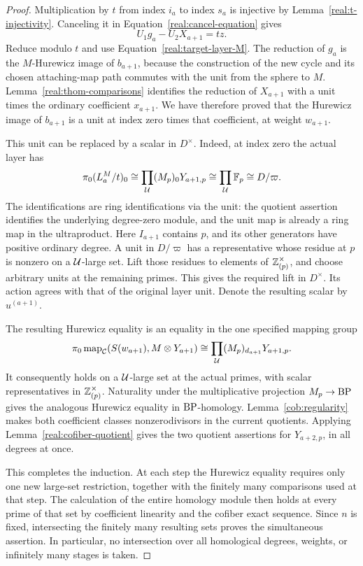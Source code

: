 \begin{proof}
Multiplication by \(t\) from index \(i_a\) to index \(s_a\)
is injective by Lemma~\ref{real:t-injectivity}.  Canceling it in
Equation~\eqref{real:cancel-equation} gives
\[
 U_1g_a-U_2X_{a+1}=tz.
\]
Reduce modulo \(t\) and use
Equation~\eqref{real:target-layer-M}.  The reduction of \(g_a\)
is the \(M\)-Hurewicz image of \(b_{a+1}\), because the
construction of the new cycle and its chosen attaching-map path
commutes with the unit from the sphere to \(M\).
Lemma~\ref{real:thom-comparisons} identifies the reduction of
\(X_{a+1}\) with a unit times the ordinary coefficient
\(x_{a+1}\).  We have therefore proved that the Hurewicz image
of \(b_{a+1}\) is a unit at index zero times that coefficient,
at weight \(w_{a+1}\).

This unit can be replaced by a scalar in \(D^\times\).
Indeed, at index zero the actual layer has
\begin{equation}
 \pi_0(L_a^M/t)_0
 \cong\prod_{\mathcal U}(M_p)_0Y_{a+1,p}
 \cong\prod_{\mathcal U}\mathbb F_p
 \cong D/\varpi.
 \label{real:scalar-layer}
\end{equation}
The identifications are ring identifications via the unit: the
quotient assertion identifies the underlying degree-zero module,
and the unit map is already a ring map in the ultraproduct.
Here \(I_{a+1}\) contains \(p\), and its other generators have
positive ordinary degree.  A unit in \(D/\varpi\) has a
representative whose residue at \(p\) is nonzero on a
\(\mathcal U\)-large set.  Lift those residues to elements of
\(\mathbb Z_{(p)}^\times\), and choose arbitrary units at the
remaining primes.  This gives the required lift in \(D^\times\).
Its action agrees with that of the original layer unit.  Denote the
resulting scalar by \(u^{(a+1)}\).

The resulting Hurewicz equality is an equality in the one specified
mapping group
\[
 \pi_0\operatorname{map}_{\mathcal C}(S(w_{a+1}),M\otimes Y_{a+1})
 \cong
 \prod_{\mathcal U}(M_p)_{d_{a+1}}Y_{a+1,p}.
\]
It consequently holds on a \(\mathcal U\)-large set at the actual
primes, with scalar representatives in \(\mathbb Z_{(p)}^\times\).
Naturality under the multiplicative projection \(M_p\to\mathrm{BP}\)
gives the analogous Hurewicz equality in \(\mathrm{BP}\)-homology.
Lemma~\ref{cob:regularity} makes both coefficient classes
nonzerodivisors in the current quotients.  Applying
Lemma~\ref{real:cofiber-quotient} gives the two quotient assertions
for \(Y_{a+2,p}\), in all degrees at once.

This completes the induction.  At each step the Hurewicz equality
requires only one new large-set restriction, together with the
finitely many comparisons used at that step.  The calculation of
the entire homology module then holds at every prime of that set
by coefficient linearity and the cofiber exact sequence.  Since
\(n\) is fixed, intersecting the finitely many resulting sets
proves the simultaneous assertion.  In particular, no intersection
over all homological degrees, weights, or infinitely many stages
is taken.
\end{proof}


